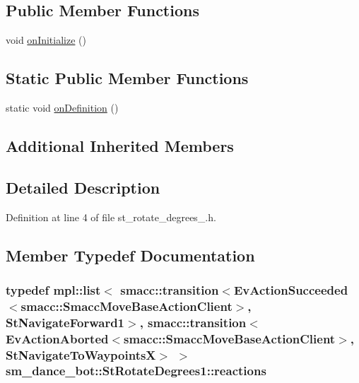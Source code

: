 \subsection*{Public Member Functions}
\begin{DoxyCompactItemize}
\item 
void \hyperlink{structsm__dance__bot_1_1StRotateDegrees1_a49fc454b780c8e8cb999569cbbfd52a4}{on\+Initialize} ()
\end{DoxyCompactItemize}
\subsection*{Static Public Member Functions}
\begin{DoxyCompactItemize}
\item 
static void \hyperlink{structsm__dance__bot_1_1StRotateDegrees1_a535acd0db1ac8c148f205e227682b6a5}{on\+Definition} ()
\end{DoxyCompactItemize}
\subsection*{Additional Inherited Members}


\subsection{Detailed Description}


Definition at line 4 of file st\+\_\+rotate\+\_\+degrees\+\_.\+h.



\subsection{Member Typedef Documentation}
\subsubsection[{\texorpdfstring{reactions}{reactions}}]{\setlength{\rightskip}{0pt plus 5cm}typedef mpl\+::list$<$ {\bf smacc\+::transition}$<$Ev\+Action\+Succeeded$<${\bf smacc\+::\+Smacc\+Move\+Base\+Action\+Client}$>$, {\bf St\+Navigate\+Forward1}$>$, {\bf smacc\+::transition}$<$Ev\+Action\+Aborted$<${\bf smacc\+::\+Smacc\+Move\+Base\+Action\+Client}$>$, {\bf St\+Navigate\+To\+WaypointsX}$>$ $>$ {\bf sm\+\_\+dance\+\_\+bot\+::\+St\+Rotate\+Degrees1\+::reactions}}\hypertarget{structsm__dance__bot_1_1StRotateDegrees1_a47cddc91cfe538fc5f88847982029bce}{}\label{structsm__dance__bot_1_1StRotateDegrees1_a47cddc91cfe538fc5f88847982029bce}


